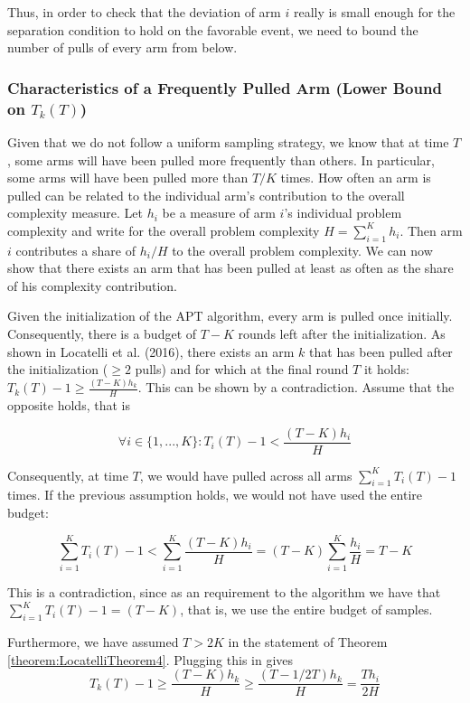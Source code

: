 \documentclass[12pt,]{article}
\begin{document}
Thus, in order to check that the deviation of arm \(i\) really is small
enough for the separation condition to hold on the favorable event, we
need to bound the number of pulls of every arm from below.

\subsubsection{\texorpdfstring{Characteristics of a Frequently Pulled
Arm (Lower Bound on
\(T_k(T)\))}{Characteristics of a Frequently Pulled Arm (Lower Bound on T\_k(T))}}\label{characteristics-of-a-frequently-pulled-arm-lower-bound-on-t_kt}

Given that we do not follow a uniform sampling strategy, we know that at
time \(T\), some arms will have been pulled more frequently than others.
In particular, some arms will have been pulled more than \(T/K\) times.
How often an arm is pulled can be related to the individual arm's
contribution to the overall complexity measure. Let \(h_i\) be a measure
of arm \(i\)'s individual problem complexity and write for the overall
problem complexity \(H = \sum_{i = 1}^{K} h_i\). Then arm \(i\)
contributes a share of \(h_i/H\) to the overall problem complexity. We
can now show that there exists an arm that has been pulled at least as
often as the share of his complexity contribution.

Given the initialization of the APT algorithm, every arm is pulled once
initially. Consequently, there is a budget of \(T-K\) rounds left after
the initialization. As shown in Locatelli et al. (2016), there exists an
arm \(k\) that has been pulled after the initialization (\(\geq 2\)
pulls) and for which at the final round \(T\) it holds:
\(T_k(T) - 1 \geq \frac{(T-K)h_k}{H}\). This can be shown by a
contradiction. Assume that the opposite holds, that is

\[
\forall i \in \{1,...,K\}: T_i(T) - 1 < \frac{(T-K)h_i}{H}
\]

Consequently, at time \(T\), we would have pulled across all arms
\(\sum_{i=1}^KT_i(T)-1\) times. If the previous assumption holds, we
would not have used the entire budget:

\[
\sum_{i=1}^K T_i(T)-1 < \sum_{i=1}^K \frac{(T-K)h_i}{H} = (T-K)\sum_{i=1}^K \frac{h_i}{H} = T-K
\]

This is a contradiction, since as an requirement to the algorithm we
have that \(\sum_{i=1}^K T_i(T)-1 = (T-K)\), that is, we use the entire
budget of samples.

Furthermore, we have assumed \(T>2K\) in the statement of Theorem
\ref{theorem:LocatelliTheorem4}. Plugging this in gives \[
T_k(T) - 1 \geq \frac{(T-K)h_k}{H} \geq \frac{(T-1/2T)h_k}{H} = \frac{Th_i}{2H}
\]
\end{document}
